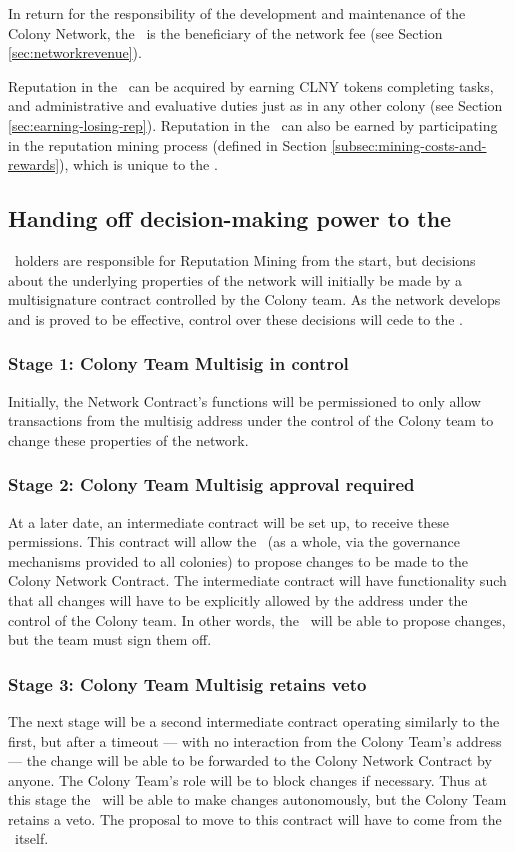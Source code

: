 In return for the responsibility of the development and maintenance of the Colony Network, the \rc\ is the beneficiary of the network fee (see Section \ref{sec:networkrevenue}).

Reputation in the \rc\ can be acquired by earning CLNY tokens completing tasks, and administrative and evaluative duties just as in any other colony (see Section \ref{sec:earning-losing-rep}). Reputation in the \rc\ can also be earned by participating in the reputation mining process (defined in Section \ref{subsec:mining-costs-and-rewards}), which is unique to the \rc.

\subsection{Handing off decision-making power to the \rc}\label{subsec:ceding-control-to-rc}
\rct\ holders are responsible for Reputation Mining from the start, but decisions about the underlying properties of the network will initially be made by a multisignature contract controlled by the Colony team. As the network develops and is proved to be effective, control over these decisions will cede to the \rc. 

\subsubsection*{Stage 1: Colony Team Multisig in control}
 Initially, the Network Contract's functions will be permissioned to only allow transactions from the multisig address under the control of the Colony team to change these properties of the network. 

\subsubsection*{Stage 2: Colony Team Multisig approval required}
At a later date, an intermediate contract will be set up, to receive these permissions. This contract will allow the \rc\ (as a whole, via the governance mechanisms provided to all colonies) to propose changes to be made to the Colony Network Contract. The intermediate contract will have functionality such that all changes will have to be explicitly allowed by the address under the control of the Colony team. In other words, the \rc\ will be able to propose changes, but the team must sign them off.

\subsubsection*{Stage 3: Colony Team Multisig retains veto}
The next stage will be a second intermediate contract operating similarly to the first, but after a timeout --- with no interaction from the Colony Team's address --- the change will be able to be forwarded to the Colony Network Contract by anyone. The Colony Team's role will be to block changes if necessary. Thus at this stage the \rc\ will be able to make changes autonomously, but the Colony Team retains a veto.  The proposal to move to this contract will have to come from the \rc\ itself. 

